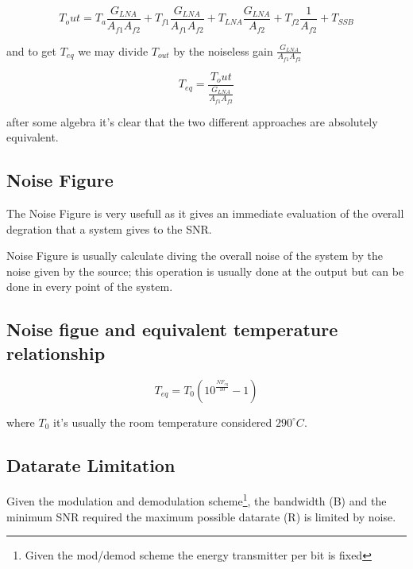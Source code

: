 \begin{equation}
	T_out = T_a\frac {G_{LNA}} {A_{f1} A_{f2} } + T_{f1}\frac { G_{LNA}} {A_{f1}A_{f2}} + T_{LNA}\frac{G_{LNA}}{A_{f2}}+ T_{f2}\frac{1}{A_{f2}} + T_{SSB} 
\end{equation}

and to get $T_{eq}$ we may divide $T_{out}$ by the noiseless gain $\frac{G_{LNA}}{A_{f1}A_{f2}}$

\begin{equation}
	T_{eq}=\frac{T_out}{\frac{G_{LNA}}{A_{f1}A_{f2}}}
\end{equation}

after some algebra it's clear that the two different approaches are absolutely equivalent.



\subsection{Noise Figure} %
\label{sub:noise_figure}

The Noise Figure is very usefull as it gives an immediate evaluation of the overall degration that a system gives to the SNR.

Noise Figure is usually  calculate diving the overall noise of the system by the noise given by the source; this operation is usually done at the output but can be done in every point of the system.


\subsection{Noise figue and equivalent temperature relationship} %
\label{sub:noise_figue_and_equivalent_temperature_relationship}


\begin{equation}
	T_{eq}= T_0(10^{\frac{NF_{eq}}{10}}-1)
\end{equation}

where $T_0$ it's usually the room temperature considered $290^{\circ}C$.


\subsection{Datarate Limitation} %
\label{sub:datarate_limitation}


Given the modulation and demodulation scheme\footnote{Given the mod/demod scheme the energy transmitter per bit is fixed}, the bandwidth (B) and the minimum SNR required the maximum possible datarate (R) is limited by noise.

